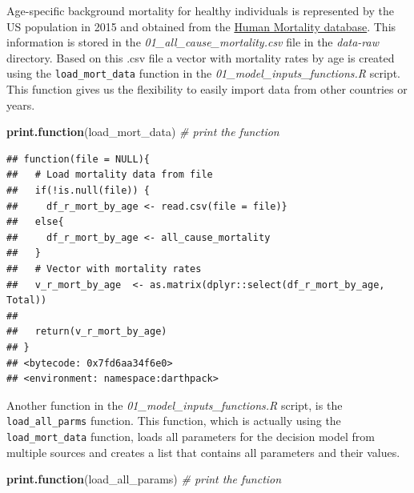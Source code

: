 \documentclass[]{book}
\newenvironment{Shaded}{\begin{snugshade}}{\end{snugshade}}
\newcommand{\KeywordTok}[1]{\textcolor[rgb]{0.13,0.29,0.53}{\textbf{#1}}}
\newcommand{\CommentTok}[1]{\textcolor[rgb]{0.56,0.35,0.01}{\textit{#1}}}
\newcommand{\NormalTok}[1]{#1}
\begin{document}
Age-specific background mortality for healthy individuals is represented
by the US population in 2015 and obtained from the
\href{https://www.mortality.org}{Human Mortality database}. This
information is stored in the \emph{01\_all\_cause\_mortality.csv} file
in the \emph{data-raw} directory. Based on this .csv file a vector with
mortality rates by age is created using the \texttt{load\_mort\_data}
function in the \emph{01\_model\_inputs\_functions.R} script. This
function gives us the flexibility to easily import data from other
countries or years.

\begin{Shaded}
\begin{Highlighting}[]
\KeywordTok{print.function}\NormalTok{(load_mort_data) }\CommentTok{# print the function}
\end{Highlighting}
\end{Shaded}

\begin{verbatim}
## function(file = NULL){
##   # Load mortality data from file
##   if(!is.null(file)) {
##     df_r_mort_by_age <- read.csv(file = file)}
##   else{
##     df_r_mort_by_age <- all_cause_mortality
##   }
##   # Vector with mortality rates
##   v_r_mort_by_age  <- as.matrix(dplyr::select(df_r_mort_by_age, Total))
##   
##   return(v_r_mort_by_age)
## }
## <bytecode: 0x7fd6aa34f6e0>
## <environment: namespace:darthpack>
\end{verbatim}

Another function in the \emph{01\_model\_inputs\_functions.R} script, is
the \texttt{load\_all\_parms} function. This function, which is actually
using the \texttt{load\_mort\_data} function, loads all parameters for
the decision model from multiple sources and creates a list that
contains all parameters and their values.

\begin{Shaded}
\begin{Highlighting}[]
\KeywordTok{print.function}\NormalTok{(load_all_params)  }\CommentTok{# print the function}
\end{Highlighting}
\end{Shaded}
\end{document}
